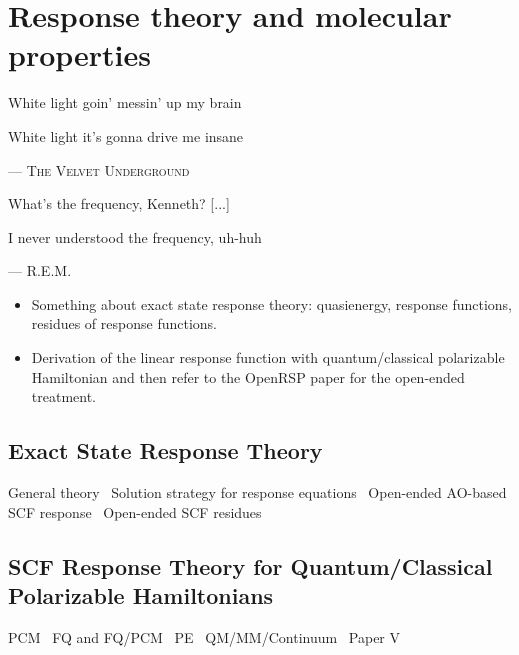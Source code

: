 \chapter{Response theory and molecular properties}\label{ch:molprop}

\epigraph{
White light goin' messin' up my brain

White light it's gonna drive me insane
}{
--- \textsc{The Velvet Underground}
}
\epigraph{What's the frequency, Kenneth? [...]

          I never understood the frequency, uh-huh}{
          --- \textsc{R.E.M.}}

\begin{itemize}
    \item Something about exact state response theory: quasienergy,
      response functions, residues of response functions.
    \item  Derivation of the linear response function with
      quantum/classical polarizable Hamiltonian and then refer to the
      OpenRSP paper for the open-ended treatment.~\autocite{pcm-openrsp}
\end{itemize}

\pagebreak

\section{Exact State Response Theory}\label{sec:exact-response}

General theory~\autocite{Olsen1985-nr, Christiansen1998-pe,
Norman2011-ad, Helgaker2012-cz, Pawlowski2015-sq}
Solution strategy for response equations~\autocite{Kauczor2011-rd}
Open-ended \acs{AO}-based \acs{SCF} response~\autocite{
Larsen2000-hj, Kjaergaard2008-hy, Thorvaldsen2008-sg,
Kristensen2008-hv, Ringholm2014-gx}
Open-ended \acs{SCF} residues~\autocite{Friese2015-kb}


\section{SCF Response Theory for Quantum/Classical Polarizable Hamiltonians}\label{sec:csm-response}

\acs{PCM}~\autocite{Cammi1994-qj, Cammi1996-wf, Cammi1996-vx,
Cammi1999-rb, Cammi2003-qy, Frediani2005-nc, Ferrighi2010-pm}
\acs{FQ} and \acs{FQ}/\acs{PCM}~\autocite{Lipparini2012-hx, Lipparini2012-tl, Lipparini2013-ud}
\acs{PE}~\autocite{Olsen2010-wa}
\acs{QM}/\acs{MM}/Continuum~\autocite{Stenidal2011-ki, Caprasecca2012-ir}
Paper V~\autocite{pcm-openrsp}
